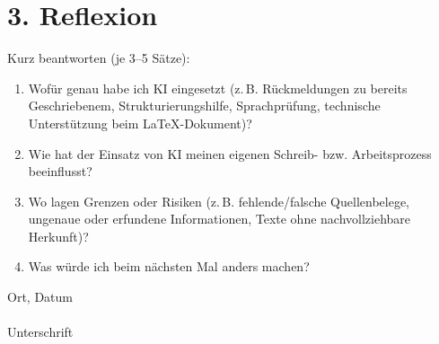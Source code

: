 \documentclass[11pt,a4paper]{article}
\begin{document}
\section*{3. Reflexion}

\noindent Kurz beantworten (je 3--5 Sätze):

\begin{enumerate}[leftmargin=1.4em]
  \item Wofür genau habe ich KI eingesetzt (z.\,B. Rückmeldungen zu
    bereits Geschriebenem, Strukturierungshilfe, Sprachprüfung,
    technische Unterstützung beim LaTeX-Dokument)?

    \vspace{4em}

  \item Wie hat der Einsatz von KI meinen eigenen Schreib- bzw.
    Arbeitsprozess beeinflusst?

    \vspace{4em}

  \item Wo lagen Grenzen oder Risiken (z.\,B. fehlende/falsche
    Quellenbelege, ungenaue oder erfundene Informationen, Texte ohne
    nachvollziehbare Herkunft)?

    \vspace{4em}

  \item Was würde ich beim nächsten Mal anders machen?

    \vspace{4em}
\end{enumerate}

\vspace{2em}

\noindent
\begin{minipage}{0.45\textwidth}
  Ort, Datum \\[2.5cm]
  \hrulefill \\
  Unterschrift
\end{minipage}
\end{document}
